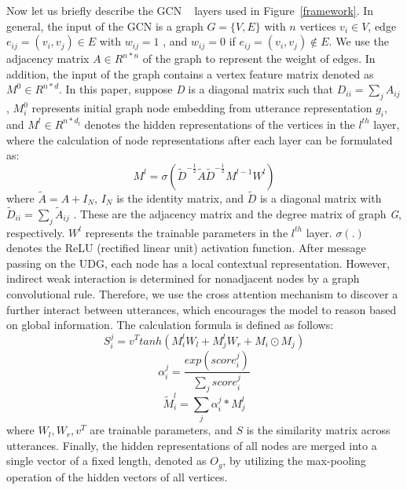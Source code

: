 \documentclass[letterpaper]{article} %
\begin{document}
Now let us briefly describe the GCN ~\cite{kipf2016semi} layers used in Figure~\ref{framework}. In general, the input of the GCN is a graph $G=\{V,E\}$ with $n$ vertices $v_i \in V$, edge $e_{ij}=(v_i,v_j) \in E$ with $w_{ij} = 1$ , and $w_{ij} = 0$ if $e_{ij}=(v_i,v_j) \not\in E$. We use the adjacency matrix $A \in R^{n*n}$ of the graph to represent the weight of edges. In addition, the input of the graph contains a vertex feature matrix denoted as $ M^0 \in R^{n*d}$. In this paper, suppose \textit{D} is a diagonal matrix such that $D_{ii}=\sum_j A_{ij}$, $M_i^0$ represents initial graph node embedding from utterance representation $g_i$, and $M^l \in R^{n*d_l}$ denotes the hidden representations of the vertices in the $l^{th}$ layer, where the calculation of node representations after each layer can be formulated as:
\begin{equation}
  M^{l}=\sigma(\tilde{D}^{-\frac{1}{2}} \tilde{A}\tilde{D}^{-\frac{1}{2}} M^{l-1} W^l)
\end{equation}
where $\tilde{A}=A+I_N$, $I_N$ is the identity matrix, and $\tilde{D}$ is a diagonal matrix with $\tilde{D}_{ii}=\sum_j \tilde{A}_{ij}$ . These are the adjacency matrix and the degree matrix of graph \textit{G}, respectively. $W^l$ represents the trainable parameters in the $l^{th}$ layer. $\sigma(.)$ denotes the ReLU (rectified linear unit) activation function. After message passing on the UDG, each node has a local contextual representation. However, indirect weak interaction is determined for nonadjacent nodes by a graph convolutional rule. Therefore, we use the cross attention mechanism to discover a further interact between utterances, which encourages the model to reason based on global information. The calculation formula is defined as follows:
\begin{equation}
  S_i^j=v^T tanh(M_i^l W_l + M_j^l W_r + M_i \odot M_j)
\end{equation}
\begin{equation}
  \alpha_i^j=\frac{exp(score_i^j)}{\sum_j score_i^j}
\end{equation}
\begin{equation}
  \tilde{M}_i^l=\sum_j \alpha_i^j * M_j^l
\end{equation}
where $W_l,W_r,v^T$ are trainable parameters, and $S$ is the similarity matrix across utterances. Finally, the hidden representations of all nodes are merged into a single vector of a fixed length, denoted as $O_g$, by utilizing the max-pooling operation of the hidden vectors of all vertices.
\end{document}
